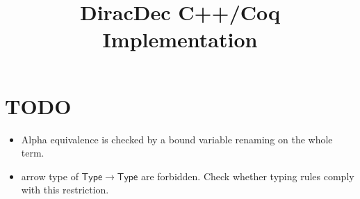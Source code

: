 \documentclass{article}
\title{\textbf{DiracDec C++/Coq Implementation\cite{ExampleCitation}}}
\begin{document}
\maketitle


\newcommand{\reduce}{\triangleright}

\newcommand{\Sort}{\mathsf{Sort}}
\newcommand{\WF}{\mathcal{WF}}

\newcommand{\Index}{\mathsf{Index}}
\newcommand{\Type}{\mathsf{Type}}
\newcommand{\Basis}{\mathsf{Basis}}

\newcommand{\SType}{\mathcal{S}}
\newcommand{\KType}{\mathcal{K}}
\newcommand{\BType}{\mathcal{B}}
\newcommand{\OType}{\mathcal{O}}
\newcommand{\SET}{\mathsf{Set}}

\newcommand{\ZEROK}{\mathbf{0}_\mathcal{K}}
\newcommand{\ZEROB}{\mathbf{0}_\mathcal{B}}
\newcommand{\ZEROO}{\mathbf{0}_\mathcal{O}}

\newcommand{\PAIR}{\mathsf{PAIR}}

\newcommand{\ZERO}{\mathsf{0}}
\newcommand{\ONE}{\mathsf{1}}
\newcommand{\ADDS}{\mathsf{ADDS}}
\newcommand{\ADD}{\mathsf{ADD}}
\newcommand{\MULS}{\mathsf{MULS}}
\newcommand{\MUL}{\mathsf{MUL}}
\newcommand{\CONJ}{\mathsf{CONJ}}
\newcommand{\CJG}{\mathsf{CJG}}
\newcommand{\ADJ}{\mathsf{ADJ}}
\newcommand{\DELTA}{\mathsf{DELTA}}
\newcommand{\DOT}{\mathsf{DOT}}
\newcommand{\SCR}{\mathsf{SCR}}
\newcommand{\TSR}{\mathsf{TSR}}
\newcommand{\KET}{\mathsf{KET}}
\newcommand{\BRA}{\mathsf{BRA}}
\newcommand{\ONEO}{\mathbf{1}_\mathcal{O}}
\newcommand{\OUTER}{\mathsf{OUTER}}
\newcommand{\MULK}{\mathsf{MULK}}
\newcommand{\MULB}{\mathsf{MULB}}
\newcommand{\MULO}{\mathsf{MULO}}


\section{TODO}
\begin{itemize}
    \item Alpha equivalence is checked by a bound variable renaming on the whole term.
    \item arrow type of $\Type \to \Type$ are forbidden. Check whether typing rules comply with this restriction.
\end{itemize}


\end{document}
